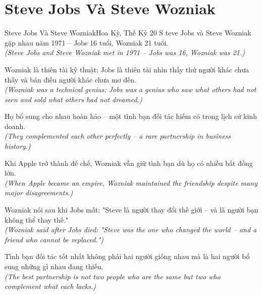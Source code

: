\section{Steve Jobs Và Steve Wozniak}
\begin{truyen}{Steve Jobs Và Steve Wozniak}{Hoa Kỳ, Thế Kỷ 20}
S teve Jobs và Steve Wozniak gặp nhau năm 1971 -- Jobs 16 tuổi, Wozniak 21 tuổi.\\
\textit{(Steve Jobs and Steve Wozniak met in 1971 -- Jobs was 16, Wozniak was 21.)}

Wozniak là thiên tài kỹ thuật; Jobs là thiên tài nhìn thấy thứ người khác chưa thấy và bán điều người khác chưa mơ đến.\\
\textit{(Wozniak was a technical genius; Jobs was a genius who saw what others had not seen and sold what others had not dreamed.)}

Họ bổ sung cho nhau hoàn hảo -- một tình bạn đối tác hiếm có trong lịch sử kinh doanh.\\
\textit{(They complemented each other perfectly -- a rare partnership in business history.)}

Khi Apple trở thành đế chế, Wozniak vẫn giữ tình bạn dù họ có nhiều bất đồng lớn.\\
\textit{(When Apple became an empire, Wozniak maintained the friendship despite many major disagreements.)}

Wozniak nói sau khi Jobs mất: "Steve là người thay đổi thế giới -- và là người bạn không thể thay thế."\\
\textit{(Wozniak said after Jobs died: "Steve was the one who changed the world -- and a friend who cannot be replaced.")}

\end{truyen}
\begin{baihoc}
  Tình bạn đối tác tốt nhất không phải hai người giống nhau mà là hai người bổ sung những gì nhau đang thiếu.\\
  \textit{(The best partnership is not two people who are the same but two who complement what each lacks.)}
\end{baihoc}

